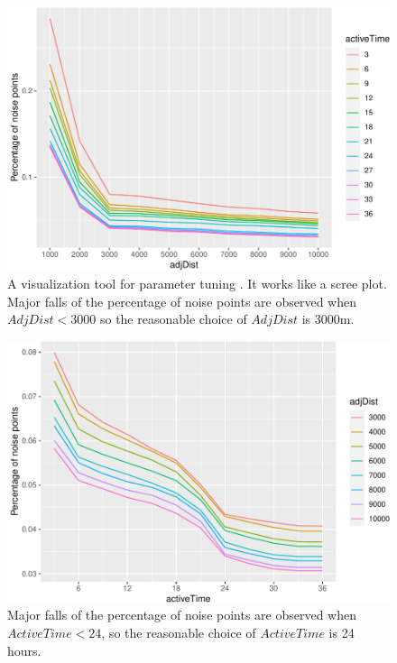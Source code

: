 \begin{Schunk}
\begin{figure}

{\centering \includegraphics[width=0.8\linewidth]{clustering_paper_files/figure-latex/vis1-1} 

}

\caption[A visualization tool for parameter tuning ]{A visualization tool for parameter tuning . It works like a scree plot. Major falls of the percentage of noise points are observed when $AdjDist < 3000$ so the reasonable choice of $AdjDist$ is 3000m.}\label{fig:vis1}
\end{figure}
\end{Schunk}

\begin{Schunk}
\begin{figure}

{\centering \includegraphics[width=0.8\linewidth]{clustering_paper_files/figure-latex/vis2-1} 

}

\caption[Major falls of the percentage of noise points are observed when $ActiveTime < 24$, so the reasonable choice of $ActiveTime$ is 24 hours]{Major falls of the percentage of noise points are observed when $ActiveTime < 24$, so the reasonable choice of $ActiveTime$ is 24 hours.}\label{fig:vis2}
\end{figure}
\end{Schunk}

